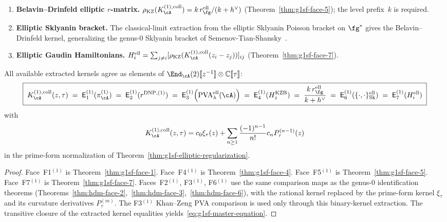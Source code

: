 \begin{theorem}
\begin{enumerate}[label=\textup{(F\arabic*${}^{(1)}$)}]
\item \textbf{Belavin--Drinfeld elliptic $r$-matrix.}
$\rho_{\mathrm{KZ}}(K_\cA^{(1),\mathrm{coll}})
=k\,r^{\mathrm{ell}}_\fg/(k+h^\vee)$
\textup{(}Theorem~\textup{\ref{thm:g1sf-face-5})}; the level
prefix~$k$ is required.

\item \textbf{Elliptic Sklyanin bracket.}
The classical-limit extraction from the elliptic Sklyanin Poisson
bracket on $\fg^*$ gives the Belavin--Drinfeld kernel, generalizing
the genus-$0$ Sklyanin bracket of
Semenov-Tian-Shansky~\cite{STS83}.

\item \textbf{Elliptic Gaudin Hamiltonians.}
$H_i^{\mathrm{ell}}=\sum_{j\neq i}
[\rho_{\mathrm{KZ}}(K_\cA^{(1),\mathrm{coll}}(z_i-z_j))]_{ij}$
\textup{(}Theorem~\textup{\ref{thm:g1sf-face-7})}.
\end{enumerate}
All available extracted kernels agree as elements of
$\End_\cA(2)[\![z^{-1}]\!] \otimes \mathbb{C}[\![\tau]\!]$:
\begin{equation}\label{eq:g1sf-master-equation}
\boxed{\;
K_\cA^{(1),\mathrm{coll}}(z,\tau)
\;=\;
\mathsf E_1^{(1)}(\pi_\cA^{(1)})
\;=\;
\mathsf E_2^{(1)}(r^{\mathrm{DNP},(1)})
\;=\;
\mathsf E_3^{(1)}\!\left(
\mathrm{PVA}^{\mathrm{ell}}_{\lambda}(\cA)\right)
\;=\;
\mathsf E_4^{(1)}(H_z^{\mathrm{KZB}})
\;=\;
\frac{k\,r^{\mathrm{ell}}_\fg}{k + h^\vee}
\;=\;
\mathsf E_6^{(1)}(\{\cdot,\cdot\}_{\mathrm{Sk}}^{\mathrm{ell}})
\;=\;
\mathsf E_7^{(1)}(H_i^{\mathrm{ell}})
\;}
\end{equation}
with
\[
K_\cA^{(1),\mathrm{coll}}(z,\tau)
=
c_0\xi_\tau(z)
+
\sum_{n\geq1}\frac{(-1)^{n-1}}{n!}c_nP_\tau^{(n-1)}(z)
\]
in the prime-form normalization of
Theorem~\ref{thm:g1sf-elliptic-regularization}.
\end{theorem}

\begin{proof}
Face~F1$^{(1)}$ is Theorem~\ref{thm:g1sf-face-1}.
Face~F4$^{(1)}$ is Theorem~\ref{thm:g1sf-face-4}.
Face~F5$^{(1)}$ is Theorem~\ref{thm:g1sf-face-5}.
Face~F7$^{(1)}$ is Theorem~\ref{thm:g1sf-face-7}.
Faces~F2$^{(1)}$, F3$^{(1)}$, F6$^{(1)}$ use the same comparison maps
as the genus-$0$ identification theorems
(Theorems~\ref{thm:hdm-face-2},~\ref{thm:hdm-face-3},~\ref{thm:hdm-face-6}),
with the rational kernel replaced by the prime-form kernel
$\xi_\tau$ and its curvature derivatives $P_\tau^{(m)}$. The
F3$^{(1)}$ Khan--Zeng PVA comparison is used only through this
binary-kernel extraction. The transitive closure of the extracted
kernel equalities yields~\eqref{eq:g1sf-master-equation}.
\end{proof}

